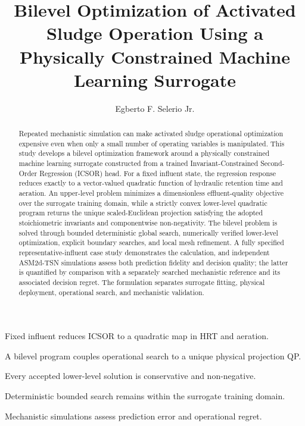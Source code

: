 \documentclass[a4paper,fleqn]{cas-sc}
\begin{document}
\let\WriteBookmarks\relax
\def\floatpagepagefraction{1}
\def\textpagefraction{.001}


\title[mode=title]{Bilevel Optimization of Activated Sludge Operation Using a Physically Constrained Machine Learning Surrogate}

\author[1]{Egberto F. Selerio Jr.}
\cormark[1]



\begin{abstract}
Repeated mechanistic simulation can make activated sludge operational optimization expensive even when only a small number of operating variables is manipulated. This study develops a bilevel optimization framework around a physically constrained machine learning surrogate constructed from a trained Invariant-Constrained Second-Order Regression (ICSOR) head. For a fixed influent state, the regression response reduces exactly to a vector-valued quadratic function of hydraulic retention time and aeration. An upper-level problem minimizes a dimensionless effluent-quality objective over the surrogate training domain, while a strictly convex lower-level quadratic program returns the unique scaled-Euclidean projection satisfying the adopted stoichiometric invariants and componentwise non-negativity. The bilevel problem is solved through bounded deterministic global search, numerically verified lower-level optimization, explicit boundary searches, and local mesh refinement. A fully specified representative-influent case study demonstrates the calculation, and independent ASM2d-TSN simulations assess both prediction fidelity and decision quality; the latter is quantified by comparison with a separately searched mechanistic reference and its associated decision regret. The formulation separates surrogate fitting, physical deployment, operational search, and mechanistic validation.
\end{abstract}

\begin{highlights}
\item Fixed influent reduces ICSOR to a quadratic map in HRT and aeration.
\item A bilevel program couples operational search to a unique physical projection QP.
\item Every accepted lower-level solution is conservative and non-negative.
\item Deterministic bounded search remains within the surrogate training domain.
\item Mechanistic simulations assess prediction error and operational regret.
\end{highlights}
\end{document}
